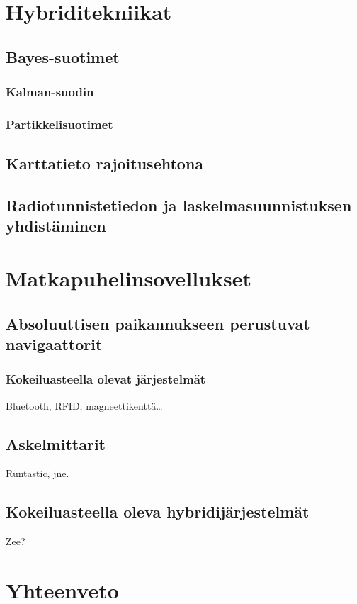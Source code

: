 \documentclass[a4paper]{scrartcl}
\begin{document}
\section{Hybriditekniikat}
\cite{woodman2010pedestrian}
\cite{evennou2006advanced}
\cite{leppakoski2013pedestrian}
\subsection{Bayes-suotimet}
\subsubsection{Kalman-suodin}
\subsubsection{Partikkelisuotimet}
\subsection{Karttatieto rajoitusehtona}
\cite{li2012reliable}
\subsection{Radiotunnistetiedon ja laskelmasuunnistuksen yhdistäminen}
\cite{rai2012zee}

\section{Matkapuhelinsovellukset}
\subsection{Absoluuttisen paikannukseen perustuvat navigaattorit}
\subsubsection{Kokeiluasteella olevat järjestelmät}
Bluetooth, RFID, magneettikenttä\ldots
\subsection{Askelmittarit}
Runtastic, jne.
\subsection{Kokeiluasteella oleva hybridijärjestelmät}
Zee?

\section{Yhteenveto}



\end{document}
